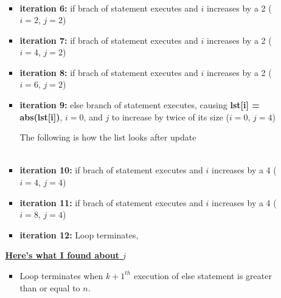 \documentclass[12pt]{article}
\begin{document}
\begin{enumerate}[a.]
\begin{itemize}
\begin{itemize}
            \begin{align*}
                [0,0,0,0,1,-1,-1,-1]
            \end{align*}

            \item \textbf{iteration 6:} if brach of statement executes and $i$ increases
            by a 2 ($i = 2$, $j = 2$)
            \item \textbf{iteration 7:} if brach of statement executes and $i$ increases
            by a 2 ($i = 4$, $j = 2$)
            \item \textbf{iteration 8:} if brach of statement executes and $i$ increases
            by a 2 ($i = 6$, $j = 2$)

            \item \textbf{iteration 9:} else branch of statement executes, causing
            \textbf{lst[i] = abs(lst[i])}, $i = 0$, and $j$ to increase by twice of its size ($i = 0$, $j = 4$)

            \bigskip

            The following is how the list looks after update

            \begin{align*}
                [0,0,0,0,1,-1,1,-1]
            \end{align*}

            \item \textbf{iteration 10:} if brach of statement executes and $i$ increases
            by a 4 ($i = 4$, $j = 4$)

            \item \textbf{iteration 11:} if brach of statement executes and $i$ increases
            by a 4 ($i = 8$, $j = 4$)

            \item \textbf{iteration 12:} Loop terminates,
        \end{itemize}

        \bigskip

        \underline{\textbf{Here's what I found about $j$}}

        \bigskip

        \begin{itemize}
            \item Loop terminates when $k+1^{th}$ execution of else statement is greater than or equal to $n$.
        \end{itemize}

        \bigskip


\end{itemize}
\end{enumerate}
\end{document}
